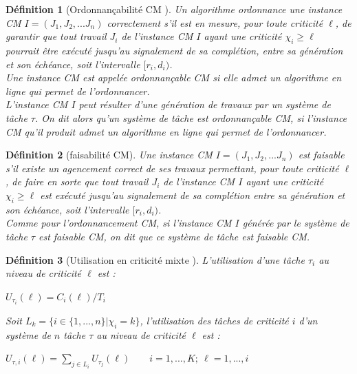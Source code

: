 \documentclass[11pt,a4paper,oneside]{book}
\theoremstyle{break}
\newtheorem{defin}{Définition}
\theoremstyle{breakplain}
\begin{document}
\begin{defin}[Ordonnançabilité CM \cite{BaruahBDMSS11}]
Un algorithme ordonnance une instance CM $I = (J_1, J_2, ... J_n)$ correctement s'il est en mesure, pour toute criticité $\ell$, de garantir que tout travail $J_i$ de l'instance CM $I$ ayant une criticité $\chi_i \geq \ell$ pourrait être exécuté jusqu'au signalement de sa complétion, entre sa génération et son échéance, soit l'intervalle $[r_i, d_i)$.\\ Une instance CM est appelée ordonnançable CM si elle admet un algorithme en ligne qui permet de l'ordonnancer.\\

L'instance CM $I$ peut résulter d'une génération de travaux par un système de tâche $\tau$. On dit alors qu'un système de tâche est ordonnançable CM, si l'instance CM qu'il produit admet un algorithme en ligne qui permet de l'ordonnancer.
\end{defin}

\begin{defin}[faisabilité CM]
Une instance CM $I = (J_1, J_2, ... J_n)$ est faisable s'il existe un agencement correct de ses travaux permettant, pour toute criticité $\ell$, de faire en sorte que tout travail $J_i$ de l'instance CM $I$ ayant une criticité $\chi_i \geq \ell$ est exécuté jusqu'au signalement de sa complétion entre sa génération et son échéance, soit l'intervalle $[r_i, d_i)$.\\

Comme pour l'ordonnancement CM, si l'instance CM $I$ générée par le système de tâche $\tau$ est faisable CM, on dit que ce système de tâche est faisable CM.
\end{defin}

\begin{defin}[Utilisation en criticité mixte \cite{BaruahBDMSS11}]
L'utilisation d'une tâche $\tau_i$ au niveau de criticité $\ell$ est :
\begin{center}
$U_{\tau_i}(\ell) = C_i(\ell)/T_i$
\end{center}
Soit $L_k = \{i \in \{1, ..., n\} | \chi_i = k\}$, l'utilisation des tâches de criticité $i$ d'un système de $n$ tâche $\tau$ au niveau de criticité $\ell$ est :
\begin{center}
$U_{\tau, i}(\ell) = \underset{j \in L_i}{\sum} U_{\tau_j}(\ell) \qquad i = 1,...,K;\ \ell = 1,...,i$
\end{center}
\end{defin}
\end{document}
